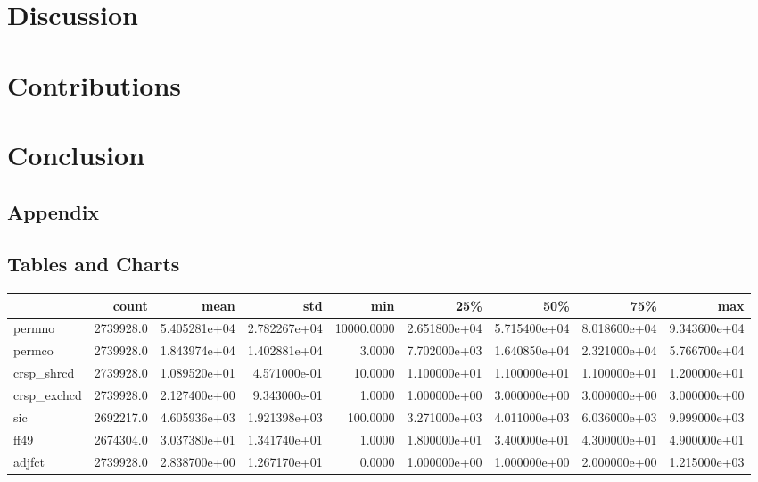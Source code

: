 \documentclass[12pt]{article}
\begin{document}
\section{Discussion}
\section{Contributions}
\section{Conclusion}
\newpage
\begin{landscape}
\section{Appendix}
\subsection{Tables and Charts}
\setlength{\tabcolsep}{2pt}
\begin{longtable}{|l|r|r|r|r|r|r|r|r|}
\toprule
{} &      count &          mean &           std &         min &           25\% &           50\% &           75\% &           max \\
\midrule
\endhead
permno                  &  2739928.0 &  5.405281e+04 &  2.782267e+04 &  10000.0000 &  2.651800e+04 &  5.715400e+04 &  8.018600e+04 &  9.343600e+04 \\
permco                  &  2739928.0 &  1.843974e+04 &  1.402881e+04 &      3.0000 &  7.702000e+03 &  1.640850e+04 &  2.321000e+04 &  5.766700e+04 \\
crsp\_shrcd              &  2739928.0 &  1.089520e+01 &  4.571000e-01 &     10.0000 &  1.100000e+01 &  1.100000e+01 &  1.100000e+01 &  1.200000e+01 \\
crsp\_exchcd             &  2739928.0 &  2.127400e+00 &  9.343000e-01 &      1.0000 &  1.000000e+00 &  3.000000e+00 &  3.000000e+00 &  3.000000e+00 \\
sic                     &  2692217.0 &  4.605936e+03 &  1.921398e+03 &    100.0000 &  3.271000e+03 &  4.011000e+03 &  6.036000e+03 &  9.999000e+03 \\
ff49                    &  2674304.0 &  3.037380e+01 &  1.341740e+01 &      1.0000 &  1.800000e+01 &  3.400000e+01 &  4.300000e+01 &  4.900000e+01 \\
adjfct                  &  2739928.0 &  2.838700e+00 &  1.267170e+01 &      0.0000 &  1.000000e+00 &  1.000000e+00 &  2.000000e+00 &  1.215000e+03 \\

\end{longtable}
\end{landscape}
\end{document}
